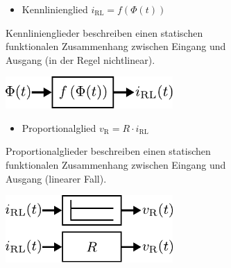 \begin{figure}[h]
  \begin{subfigure}[c]{\textwidth}
	\begin{minipage}{0.5\textwidth}
	\begin{itemize}
		\item Kennlinienglied $i_{\text{RL}}=f(\Phi(t))$
	\end{itemize}
	Kennlinienglieder beschreiben einen statischen funktionalen Zusammenhang zwischen Eingang und Ausgang (in der Regel nichtlinear).
	\end{minipage}\hfill
	\begin{minipage}{0.5\textwidth}
		\centering
		\includegraphics[width=0.7\textwidth]{Abbildungen/Modellbildung/PDF/Kennlinienglied.pdf}
	\end{minipage}
\end{subfigure}
%
%
  \begin{subfigure}[c]{\textwidth}
	\begin{minipage}{0.5\textwidth}
		\begin{itemize}
			\item Proportionalglied $v_{\text{R}}=R\cdot i_{\text{RL}}$
		\end{itemize}
		Proportionalglieder beschreiben einen statischen funktionalen Zusammenhang zwischen Eingang und Ausgang (linearer Fall).
	\end{minipage}
	\begin{minipage}{0.5\textwidth}
		\centering
		\includegraphics[width=0.7\textwidth]{Abbildungen/Modellbildung/PDF/Proportionalglied.pdf}
	\end{minipage}
\end{subfigure} 
%
%
  \begin{subfigure}[c]{\textwidth}
	\begin{minipage}{0.5\textwidth}

\end{minipage}
\end{subfigure}
\end{figure}
